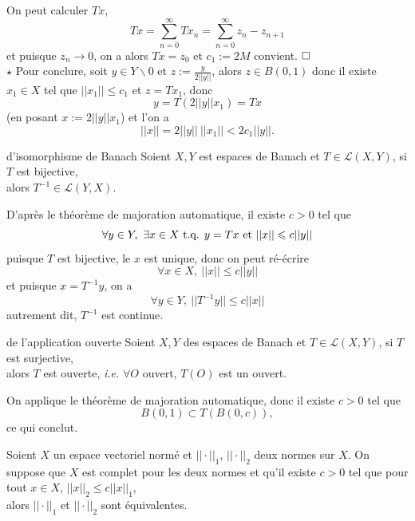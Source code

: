 \documentclass[a4paper,11pt, twoside]{article}
\begin{document}
\begin{Proof}
  On peut calculer $Tx$,
  $$Tx=\sum_{n=0}^\infty Tx_n=\sum_{n=0}^\infty z_n-z_{n+1}$$
  et puisque $z_n\longrightarrow 0$, on a alors $Tx=z_0$ et $c_1:=2M$ convient.
  $\hfill\square$\\

  $\star$ Pour conclure, soit $y\in Y\backslash {0}$ et $z:=\frac{y}{2||y||}$, alors $z\in B(0,1)$ donc il existe $x_1\in X$ tel que $||x_1||\leqslant c_1$ et $z=Tx_1$, donc
  $$y=T(2||y||x_1)=Tx$$
  (en posant $x:=2||y||x_1$) et l'on a 
  $$||x||=2||y||\ ||x_1||<2c_1||y||.$$
\end{Proof}


\begin{thC}{d'isomorphisme de Banach}
  Soient $X,Y$ est espaces de Banach et $T\in \mathcal L(X,Y)$, si $T$ est bijective,\\

  alors $T^{-1}\in \mathcal L(Y,X)$.
\end{thC}

\begin{Proof}
  D'après le théorème de majoration automatique, il existe $c>0$ tel que
  $$\forall y\in Y,\ \exists x\in X\text{ t.q. } y=Tx\text{ et }||x||\leqslant c||y||$$
  puisque $T$ est bijective, le $x$ est unique, donc on peut ré-écrire 
  $$\forall x\in X,\ ||x||\leqslant c||y||$$
  et puisque $x=T^{-1}y$, on a 
  $$\forall y\in Y,\ ||T^{-1}y||\leqslant c||x||$$
  autrement dit, $T^{-1}$ est continue. 
\end{Proof}


\begin{thC}{de l'application ouverte}
  Soient $X,Y$ des espaces de Banach et $T\in\mathcal L(X,Y)$, si $T$ est surjective,\\

  alors $T$ est ouverte, \emph{i.e.} $\forall O$ ouvert, $T(O)$ est un ouvert.
\end{thC}


\begin{Proof}
  On applique le théorème de majoration automatique, donc il existe $c>0$ tel que 
  $$B(0,1)\subset T\left(B(0,c)\right),$$
  ce qui conclut.
\end{Proof}


\begin{prop}
  Soient $X$ un espace vectoriel normé et $||\cdot||_1$, $||\cdot||_2$ deux normes sur $X$. On suppose que $X$ est complet pour les deux normes et qu'il existe $c>0$ tel que pour tout $x\in X$, $||x||_2\leqslant c||x||_1$,\\ 

  alors $||\cdot||_1$ et $||\cdot||_2$ sont équivalentes.
\end{prop}
\end{document}
